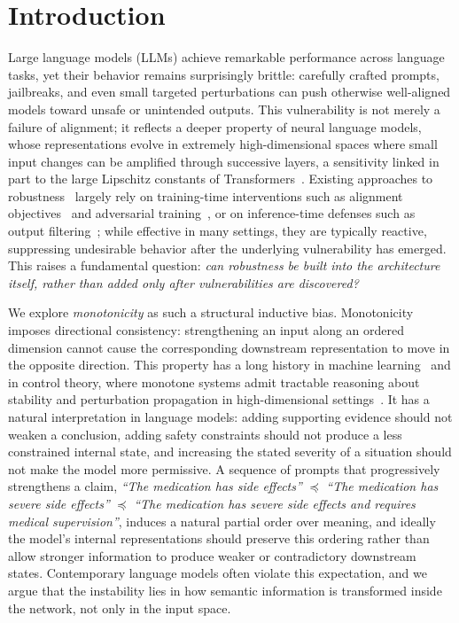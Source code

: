 \documentclass{article}
\theoremstyle{plain}
\theoremstyle{definition}
\theoremstyle{remark}
\theoremstyle{plain}
\begin{document}
\section{Introduction}
\label{sec:intro}

Large language models (LLMs) achieve remarkable performance across language tasks, yet their behavior remains surprisingly brittle: carefully crafted prompts, jailbreaks, and even small targeted perturbations can push otherwise well-aligned models toward unsafe or unintended outputs. This vulnerability is not merely a failure of alignment; it reflects a deeper property of neural language models, whose representations evolve in extremely high-dimensional spaces where small input changes can be amplified through successive layers, a sensitivity linked in part to the large Lipschitz constants of Transformers~\citep{newhouse2025training}. Existing approaches to robustness~\citep{wei2023jailbroken, su2024mission} largely rely on training-time interventions such as alignment objectives~\citep{cao2024defending} and adversarial training~\citep{howe2024effects}, or on inference-time defenses such as output filtering~\citep{khachaturov2025adversarial}; while effective in many settings, they are typically reactive, suppressing undesirable behavior after the underlying vulnerability has emerged. This raises a fundamental question: \emph{can robustness be built into the architecture itself, rather than added only after vulnerabilities are discovered?}

We explore \emph{monotonicity} as such a structural inductive bias. Monotonicity imposes directional consistency: strengthening an input along an ordered dimension cannot cause the corresponding downstream representation to move in the opposite direction. This property has a long history in machine learning~\citep{Gupta2016MonotonicLattices, runje2023constrained} and in control theory, where monotone systems admit tractable reasoning about stability and perturbation propagation in high-dimensional settings~\citep{smith1995monotone,michel2015stability,ito2014max,rantzer2014control}. It has a natural interpretation in language models: adding supporting evidence should not weaken a conclusion, adding safety constraints should not produce a less constrained internal state, and increasing the stated severity of a situation should not make the model more permissive. A sequence of prompts that progressively strengthens a claim,
\emph{``The medication has side effects''}
$\preceq$
\emph{``The medication has severe side effects''}
$\preceq$
\emph{``The medication has severe side effects and requires medical supervision''},
induces a natural partial order over meaning, and ideally the model's internal representations should preserve this ordering rather than allow stronger information to produce weaker or contradictory downstream states. Contemporary language models often violate this expectation, and we argue that the instability lies in how semantic information is transformed inside the network, not only in the input space.
\end{document}

